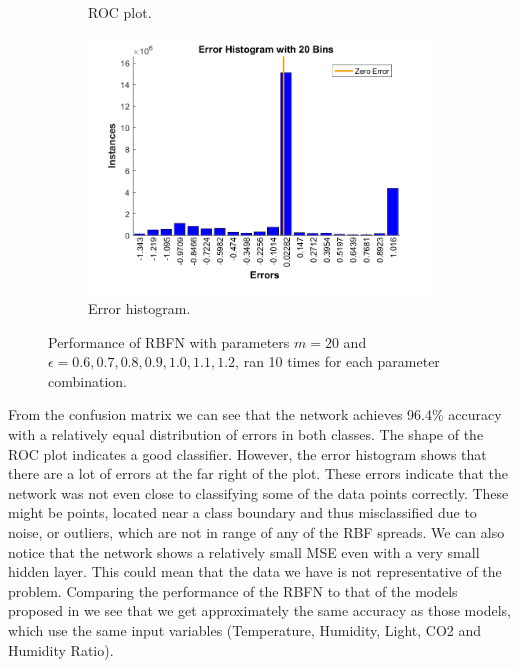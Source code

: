\documentclass[a4paper, 11pt]{article}
\begin{document}
\begin{figure}[h!]
\begin{subfigure}[t]{0.32\textwidth}
        \caption{ROC plot.}
        \label{fig:roc}
    \end{subfigure}
    \hfill %
    \begin{subfigure}[t]{0.32\textwidth}
        \includegraphics[width=\textwidth]{../figures/final/errhist.png}
        \caption{Error histogram.}
        \label{fig:errhist}
    \end{subfigure}
    \caption{Performance of RBFN with parameters $m = 20$ and $\epsilon = 0.6,0.7, 0.8, 0.9, 1.0, 1.1, 1.2$, ran 10  times for each parameter combination.}\label{fig:accuracy}
\end{figure}


From the confusion matrix we can see that the network achieves 96.4\% accuracy with a relatively equal distribution of errors in both classes. The shape of the ROC plot indicates a good classifier. However, the error histogram shows that there are a lot of errors at the far right of the plot. These errors indicate that the network was not even close to classifying some of the data points correctly. These might be points, located near a class boundary and thus misclassified due to noise, or outliers, which are not in range of any of the RBF spreads. We can also notice that the network shows a relatively small MSE even with a very small hidden layer. This could mean that the data we have is not representative of the problem. Comparing the performance of the RBFN to that of the models proposed in \cite{Candanedo2016} we see that we get approximately the same accuracy as those models, which use the same input variables (Temperature,
Humidity, Light, CO2 and Humidity Ratio).
\end{document}
